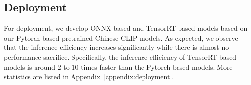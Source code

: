 \subsection{Deployment}
For deployment, we develop ONNX-based and TensorRT-based models based on our Pytorch-based pretrained Chinese CLIP models. 
As expected, we observe that the inference efficiency increases significantly while there is almost no performance sacrifice. 
Specifically, the inference efficiency of TensorRT-based models is around $2$ to $10$ times faster than the Pytorch-based models. More statistics are listed in Appendix~\ref{appendix:deployment}. 